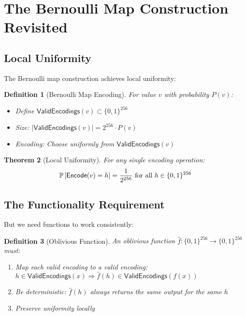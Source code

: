 \documentclass[11pt,final,hidelinks]{article}
\newcommand{\ValidEnc}{\mathsf{ValidEncodings}}
\newcommand{\Encode}{\mathsf{Encode}}
\newcommand{\HashSpace}{\{0,1\}^{256}}
\newtheorem{theorem}{Theorem}[section]
\newtheorem{definition}[theorem]{Definition}
\begin{document}
\section{The Bernoulli Map Construction Revisited}

\subsection{Local Uniformity}

The Bernoulli map construction achieves local uniformity:

\begin{definition}[Bernoulli Map Encoding]
For value $v$ with probability $P(v)$:
\begin{itemize}
    \item Define $\ValidEnc(v) \subset \HashSpace$
    \item Size: $|\ValidEnc(v)| = 2^{256} \cdot P(v)$
    \item Encoding: Choose uniformly from $\ValidEnc(v)$
\end{itemize}
\end{definition}

\begin{theorem}[Local Uniformity]
For any single encoding operation:
\begin{equation}
\Prob{\Encode(v) = h} = \frac{1}{2^{256}} \text{ for all } h \in \HashSpace
\end{equation}
\end{theorem}

\subsection{The Functionality Requirement}

But we need functions to work consistently:

\begin{definition}[Oblivious Function]
An oblivious function $\hat{f}: \HashSpace \to \HashSpace$ must:
\begin{enumerate}
    \item Map each valid encoding to a valid encoding: $h \in \ValidEnc(x) \Rightarrow \hat{f}(h) \in \ValidEnc(f(x))$
    \item Be deterministic: $\hat{f}(h)$ always returns the same output for the same $h$
    \item Preserve uniformity locally
\end{enumerate}
\end{definition}
\end{document}

